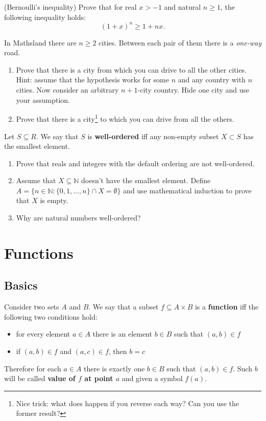 \begin{prob}
	(Bernoulli's inequality) Prove that for real $x > -1$ and natural $n\ge 1$, the following inequality holds:
	$$(1+x)^n\ge 1+nx.$$
\end{prob}

\begin{prob}
	In Mathsland there are $n\ge 2$ cities. Between each pair of them there is a \textit{one-way} road.
	\begin{enumerate}
		\item Prove that there is a city from which you can drive to all the other cities. Hint: assume that the hypothesis works for some $n$ and any
			country with $n$ cities. Now consider an arbitrary $n+1$-city country. Hide one city and use your assumption.
		\item Prove that there is a city\footnote{Nice trick: what does happen if you reverse each way? Can you use the former result?}
			to which you can drive from all the others.
	\end{enumerate}
\end{prob}

\begin{prob}
	Let $S\subseteq R$. We say that $S$ is \textbf{well-ordered} iff any non-empty subset $X\subset S$ has the smallest element.
	\begin{enumerate}
		\item Prove that reals and integers with the default ordering are not well-ordered.
		\item Assume that $X\subseteq \mathbb N$ doesn't have the smallest element. Define $A=\{n\in \mathbb N : \{0,1,\dots,n\}\cap X=\emptyset\}$
			and use mathematical induction to prove that $X$ is empty.
		\item Why are natural numbers well-ordered?
	\end{enumerate}
\end{prob}

\section{Functions}
\label{sec:intro_to_functions}

\subsection{Basics}
\noindent Consider two sets $A$ and $B$. We say that a subset $f\subseteq A\times B$ is a \textbf{function}
iff the following two conditions hold:
\begin{itemize}
	\item for every element $a\in A$ there is an element $b\in B$ such that $(a,b)\in f$
	\item if $(a,b)\in f$ and $(a,c)\in f$, then $b=c$
\end{itemize}
Therefore for each $a\in A$ there is exactly one $b\in B$ such that $(a,b)\in f$. Such $b$ will be called
\textbf{value of $f$ at point $a$} and given a symbol $f(a).$

